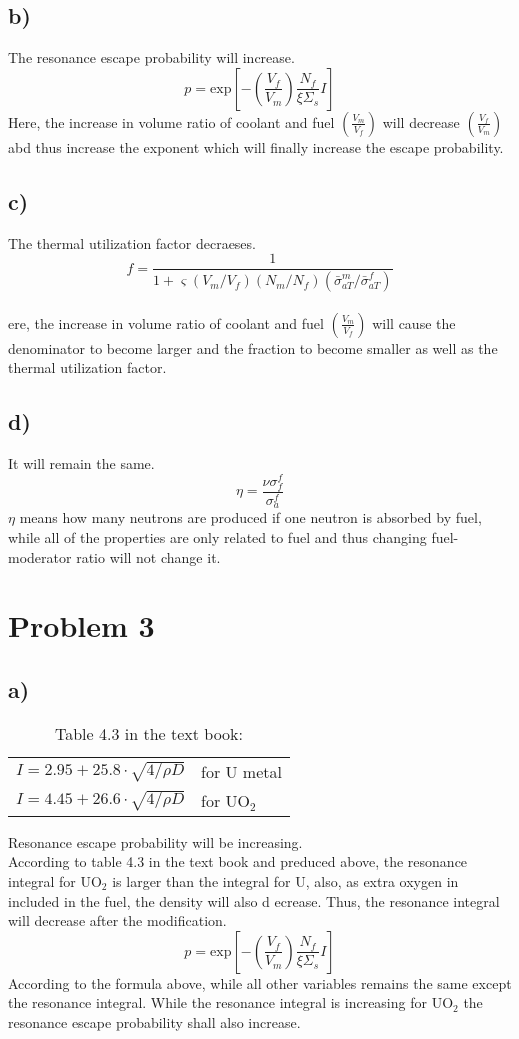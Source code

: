 \documentclass{article}
\begin{document}
\subsection*{b)}
The resonance escape probability will increase.\\
\[p=\text{exp}\left[-\left(\frac{V_f}{V_m}\right)\frac{N_f}{\xi \Sigma_s}I\right]\]
Here, the increase in volume ratio of coolant and fuel \(\left(\displaystyle\frac{V_m}{V_f}\right)\) will decrease \(\left(\displaystyle\frac{V_f}{V_m}\right)\) abd thus increase the 
exponent which will finally increase the escape probability.
\subsection*{c)}
The thermal utilization factor decraeses.\\
\[f = \frac{1}{1+\varsigma (V_m/V_f)(N_m/N_f)(\bar{\sigma}_{aT}^m/\bar{\sigma}_{aT}^f)}\]\\
ere, the increase in volume ratio of coolant and fuel \(\left(\displaystyle\frac{V_m}{V_f}\right)\) will cause the denominator to become larger and the fraction to become smaller as well as 
the thermal utilization factor.
\subsection*{d)}
It will remain the same.\\
\[\eta =\frac{\nu\sigma^f_f}{\sigma^f_a}\]
\(\eta \) means how many neutrons are produced if one neutron is absorbed by fuel, while all of the properties are only related to fuel and thus changing fuel-moderator ratio will not change it.
\section*{Problem 3}
\subsection*{a)}

\begin{table*}[h]
    \caption*{Table 4.3 in the text book:}
    \centering
    \begin{tabular}{l l}
        \hline \hline
        \(I=2.95+25.8\cdot \sqrt{4/\rho D}\)& for U metal\\
        \(I=4.45+26.6\cdot \sqrt{4/\rho D}\)& for \(\text{UO}_2\)\\
        \hline \hline        
    \end{tabular}
\end{table*}
Resonance escape probability will be increasing.\\ 
According to table 4.3 in the text book and preduced above, the resonance integral for UO\(_2\) is larger than the integral for U, also, as 
extra oxygen in included in the fuel, the density will also d
ecrease. Thus, the resonance integral will decrease after the modification.
\[p=\text{exp}\left[-\left(\frac{V_f}{V_m}\right)\frac{N_f}{\xi \Sigma_s}I\right]\]
According to the formula above, while all other variables remains the same except the resonance integral. While the resonance integral is increasing for UO\(_2\) the 
resonance escape probability shall also increase.
\end{document}
